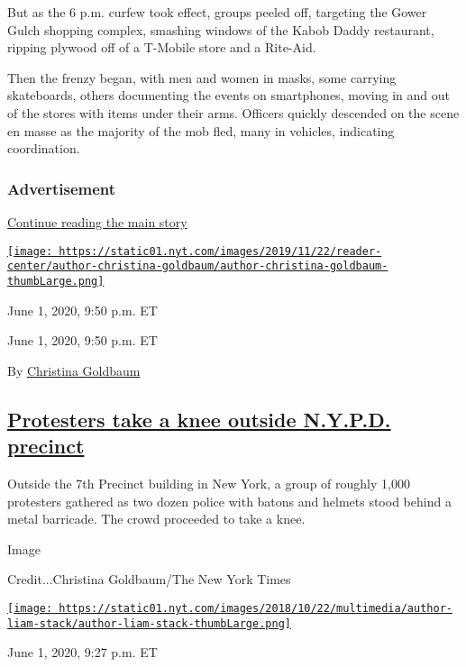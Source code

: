 But as the 6 p.m. curfew took effect, groups peeled off, targeting the
Gower Gulch shopping complex, smashing windows of the Kabob Daddy
restaurant, ripping plywood off of a T-Mobile store and a Rite-Aid.

Then the frenzy began, with men and women in masks, some carrying
skateboards, others documenting the events on smartphones, moving in and
out of the stores with items under their arms. Officers quickly
descended on the scene en masse as the majority of the mob fled, many in
vehicles, indicating coordination.

\hypertarget{advertisement-5}{%
\subsubsection{Advertisement}\label{advertisement-5}}

\protect\hyperlink{after-dfp-ad-mid6}{Continue reading the main story}

\href{https://www.nytimes.com/by/christina-goldbaum}{\texttt{[image: https://static01.nyt.com/images/2019/11/22/reader-center/author-christina-goldbaum/author-christina-goldbaum-thumbLarge.png]}}

June 1, 2020, 9:50 p.m. ET

June 1, 2020, 9:50 p.m. ET

By \href{https://www.nytimes.com/by/christina-goldbaum}{Christina
Goldbaum}

\hypertarget{protesters-take-a-knee-outside-nypd-precinct}{%
\subsection{\texorpdfstring{\protect\hyperlink{protesters-take-a-knee-outside-nypd-precinct}{Protesters
take a knee outside N.Y.P.D.
precinct}}{Protesters take a knee outside N.Y.P.D. precinct}}\label{protesters-take-a-knee-outside-nypd-precinct}}

Outside the 7th Precinct building in New York, a group of roughly 1,000
protesters gathered as two dozen police with batons and helmets stood
behind a metal barricade. The crowd proceeded to take a knee.

Image

Credit...Christina Goldbaum/The New York Times

\href{https://www.nytimes.com/by/liam-stack}{\texttt{[image: https://static01.nyt.com/images/2018/10/22/multimedia/author-liam-stack/author-liam-stack-thumbLarge.png]}}

June 1, 2020, 9:27 p.m. ET

